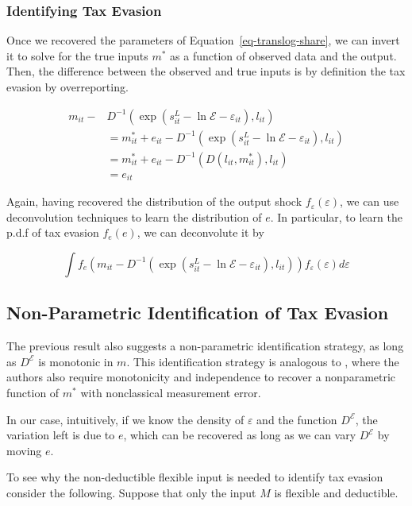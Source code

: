 \documentclass[
  12pt]{article}
\theoremstyle{definition}
\theoremstyle{remark}
\begin{document}
\subsubsection{Identifying Tax Evasion}\label{identifying-tax-evasion-1}

Once we recovered the parameters of Equation~\ref{eq-translog-share}, we
can invert it to solve for the true inputs \(m^*\) as a function of
observed data and the output. Then, the difference between the observed
and true inputs is by definition the tax evasion by overreporting.

\[
\begin{aligned}
    m_{it}-&D^{-1}(\exp(s^L_{it}-\ln\mathcal{E}-\varepsilon_{it}),l_{it})\\
    &= m_{it}^*+e_{it} -D^{-1}(\exp(s^L_{it}-\ln\mathcal{E}-\varepsilon_{it}),l_{it})\\
    &= m_{it}^*+e_{it} -D^{-1}(D(l_{it},m_{it}^*),l_{it})\\
    &=e_{it}
\end{aligned}
\]

Again, having recovered the distribution of the output shock
\(f_{\varepsilon}(\varepsilon)\), we can use deconvolution techniques to
learn the distribution of \(e\). In particular, to learn the p.d.f of
tax evasion \(f_e(e)\), we can deconvolute it by

\[
    \int f_e(m_{it}-D^{-1}(\exp(s^L_{it}-\ln\mathcal{E}-\varepsilon_{it}),l_{it})) f_{\varepsilon}(\varepsilon)d\varepsilon
\]

\subsection{Non-Parametric Identification of Tax
Evasion}\label{non-parametric-identification-of-tax-evasion}

The previous result also suggests a non-parametric identification
strategy, as long as \(D^{\mathcal{E}}\) is monotonic in \(m\). This
identification strategy is analogous to \citet{Hu2022b}, where the
authors also require monotonicity and independence to recover a
nonparametric function of \(m^*\) with nonclassical measurement error.

In our case, intuitively, if we know the density of \(\varepsilon\) and
the function \(D^{\mathcal{E}}\), the variation left is due to \(e\),
which can be recovered as long as we can vary \(D^{\mathcal{E}}\) by
moving \(e\).

To see why the non-deductible flexible input is needed to identify tax
evasion consider the following. Suppose that only the input \(M\) is
flexible and deductible.
\end{document}
